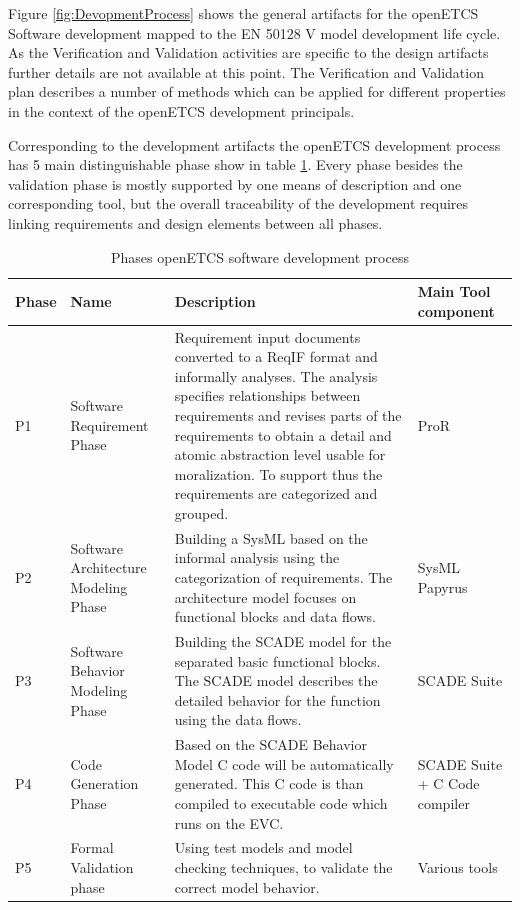 \documentclass{template/openetcs_report}
\begin{document}
Figure \ref{fig:DevopmentProcess} shows the general artifacts for the openETCS Software development mapped to the EN 50128 V model development life cycle. As the Verification and Validation activities are specific to the design artifacts further details are not available at this point. The Verification and Validation plan describes a number of methods which can be applied for different properties in the context of the openETCS development principals.

Corresponding to the development artifacts the openETCS development process has 5 main distinguishable phase show in table \ref{tab:DevelopmentPhases}. Every phase besides the validation phase is mostly supported by one means of description and one corresponding tool, but the overall traceability of the development requires linking requirements and design elements between all phases. 

\begin{table}[htbp]
  \centering
  
  \caption{Phases openETCS software development process}
\begin{tabular}{|p{1cm}|p{2cm}|p{7.5cm}|p{2.5cm}|}
\hline \textbf{Phase} & \textbf{Name} & \textbf{Description} & \textbf{Main Tool component} \\ 
\hline P1 & Software Requirement Phase & Requirement input documents converted to a ReqIF format and informally analyses. The analysis specifies relationships between requirements and revises parts of the requirements to obtain a detail and atomic abstraction level usable for moralization. To support thus the requirements are categorized and grouped. & ProR \\ 
\hline P2 & Software Architecture Modeling Phase & Building a SysML based on the informal analysis using the categorization of requirements. The architecture model focuses on functional blocks and data flows. & SysML Papyrus \\ 
\hline P3 & Software Behavior Modeling Phase & Building the SCADE model for the separated basic functional blocks. The SCADE model describes the detailed behavior for the function using the data flows. & SCADE Suite \\ 
\hline P4 & Code Generation Phase & Based on the SCADE Behavior Model C code will be automatically generated. This C code is than compiled to executable code which runs on the EVC. & SCADE Suite + C Code compiler\\
\hline P5 & Formal Validation phase & Using test models and model checking techniques, to validate the correct model behavior.  & Various tools \\ 
\hline 
\end{tabular} 
\label{tab:DevelopmentPhases}
\end{table}
\end{document}
